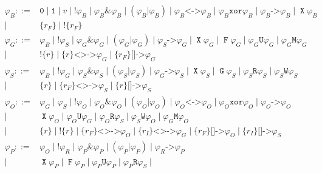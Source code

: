 \documentclass[a4paper,twoside,10pt,DIV=12]{scrreprt}
\DeclareMathOperator{\F}{\texttt{F}}
\DeclareMathOperator{\G}{\texttt{G}}
\newcommand{\U}{\mathbin{\texttt{U}}}
\newcommand{\R}{\mathbin{\texttt{R}}}
\DeclareMathOperator{\X}{\texttt{X}}
\newcommand{\M}{\mathbin{\texttt{M}}}
\newcommand{\W}{\mathbin{\texttt{W}}}
\DeclareMathOperator{\NOT}{\texttt{!}}
\newcommand{\XOR}{\mathbin{\texttt{xor}}}
\newcommand{\IMPLIES}{\mathbin{\texttt{->}}}
\newcommand{\EQUIV}{\mathbin{\texttt{<->}}}
\newcommand{\OR}{\mathbin{\texttt{|}}}
\newcommand{\AND}{\mathbin{\texttt{\&}}}
\newcommand{\0}{\texttt{0}}
\newcommand{\1}{\texttt{1}}
\newcommand{\Esuffix}{\texttt{<>->}}
\newcommand{\Asuffix}{\texttt{[]->}}
\newcommand{\sere}[1]{\texttt{\{}#1\texttt{\}}}
\newcommand{\nsere}[1]{\texttt{!\{}#1\texttt{\}}}
\begin{document}
\begin{align*}
  \varphi_B ::={}& \0\mid\1\mid v\mid\NOT\varphi_B\mid\varphi_B\AND\varphi_B
                   \mid(\varphi_B\OR\varphi_B)\mid\varphi_B\EQUIV\varphi_B
                   \mid\varphi_B\XOR\varphi_B\mid\varphi_B\IMPLIES\varphi_B
                   \mid\X\varphi_B\\
               \mid{}& \sere{r_F}\mid \nsere{r_F}\\
  \varphi_G ::={}& \varphi_B\mid \NOT\varphi_S\mid
                   \varphi_G\AND \varphi_G\mid (\varphi_G\OR \varphi_G)
                   \mid\varphi_S\IMPLIES\varphi_G\mid
                   \X\varphi_G \mid \F\varphi_G\mid
                   \varphi_G\U\varphi_G\mid \varphi_G\M\varphi_G\\
           \mid{}& \nsere{r}\mid
                   \sere{r}\Esuffix \varphi_G\mid
                   \sere{r_F}\Asuffix \varphi_G \\
  \varphi_S ::={}& \varphi_B\mid \NOT\varphi_G\mid
                   \varphi_S\AND \varphi_S\mid (\varphi_S\OR \varphi_S)
                   \mid\varphi_G\IMPLIES\varphi_S\mid
                   \X\varphi_S \mid \G\varphi_S\mid
                   \varphi_S\R\varphi_S\mid \varphi_S\W\varphi_S\\
           \mid{}& \sere{r}\mid
                   \sere{r_F}\Esuffix \varphi_S\mid
                   \sere{r}\Asuffix \varphi_S\\
  \varphi_O ::={}& \varphi_G \mid \varphi_S\mid \NOT\varphi_O\mid
                   \varphi_O\AND \varphi_O\mid (\varphi_O\OR \varphi_O)\mid
                   \varphi_O\EQUIV \varphi_O\mid \varphi_O\XOR \varphi_O\mid
                   \varphi_O\IMPLIES \varphi_O\\
           \mid{}& \X\varphi_O \mid
                   \varphi_O\U\varphi_G\mid\varphi_O\R\varphi_S \mid
                   \varphi_S\W\varphi_O\mid \varphi_G\M\varphi_O\\
           \mid{}& \sere{r} \mid \nsere{r}\mid
                   \sere{r_F}\Esuffix \varphi_O \mid \sere{r_I}\Esuffix \varphi_G\mid
                   \sere{r_F}\Asuffix \varphi_O\mid
                   \sere{r_I}\Asuffix \varphi_S\\
  \varphi_P ::={}& \varphi_O \mid \NOT\varphi_R\mid
                   \varphi_P\AND \varphi_P\mid (\varphi_P\OR \varphi_P)\mid
                   \varphi_R\IMPLIES \varphi_P\\
           \mid{}& \X\varphi_P \mid \F\varphi_P \mid
                   \varphi_P\U\varphi_P\mid\varphi_P\R\varphi_S\mid

\end{align*}
\end{document}
